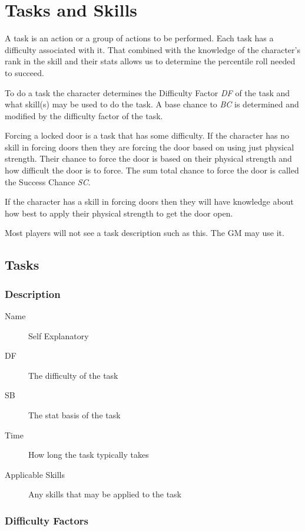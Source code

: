 \chapter{Tasks and Skills}

A {task} is an action or a group of actions to be performed. Each task has a 
difficulty associated with it. That combined with the knowledge of the character's 
rank in the skill and their stats allows us to determine the percentile roll needed 
to succeed.

To do a task the character determines the {Difficulty Factor} {\em DF} of the 
task and what skill(s) may be used to do the task. A base chance to 
{\em {BC}} is determined and modified by the difficulty factor 
of the task. 

Forcing a locked door is a task that has some difficulty. If the 
character has no skill in forcing doors then they are forcing the 
door based on using just physical strength. Their chance to force the 
door is based on their physical strength and how difficult the door 
is to force. The sum total chance to force the door is called the Success Chance {\em SC}.

If the character has a skill in forcing doors then they will have 
knowledge about how best to apply their physical strength to get the 
door open. 

Most players will not see a task description such as this. The GM may use
it.

\section{Tasks}

\subsection{Description}

\begin{description}
	\item[Name] 
	Self Explanatory
	\item[DF] The difficulty of the task
	\item[SB] The stat basis of the task
	\item[Time]
    How long the task typically takes
    \item[Applicable Skills]
    Any skills that may be applied to the task
\end{description}

\subsection{Difficulty Factors}

